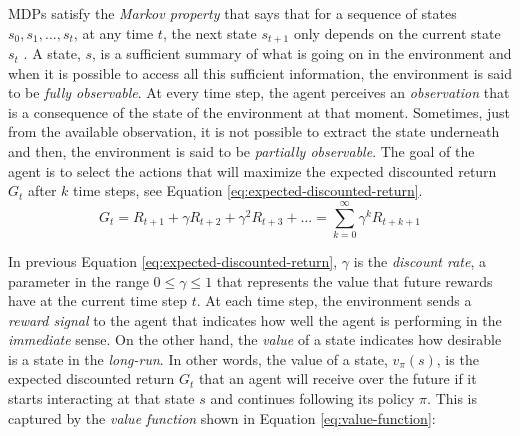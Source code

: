 








MDPs satisfy the \textit{Markov property} that says that for a sequence of states $s_0, s_1, ..., s_t$, at any time $t$, the next state $s_{t+1}$ only depends on the current state $s_t$ \cite{Osa:2018}. A state, $s$, is a sufficient summary of what is going on in the environment and when it is possible to access all this sufficient information, the environment is said to be \textit{fully observable}. At every time step, the agent perceives an \textit{observation} that is a consequence of the state of the environment at that moment. Sometimes, just from the available observation, it is not possible to extract the state underneath and then, the environment is said to be \textit{partially observable}. The goal of the agent is to select the actions that will maximize the expected discounted return $G_t$ after $k$ time steps, see Equation \eqref{eq:expected-discounted-return}.
\begin{equation}
G_t = R_{t+1} + \gamma R_{t+2} + \gamma^2 R_{t+3} +... = \sum_{k=0}^{\infty} \gamma ^k R_{t+k+1}
\label{eq:expected-discounted-return}
\end{equation}




In previous Equation \eqref{eq:expected-discounted-return}, $\gamma$ is the \textit{discount rate}, a parameter in the range $0 \leq \gamma \leq 1$ that represents the value that future rewards have at the current time step $t$. At each time step, the environment sends a \textit{reward signal} to the agent that indicates how well the agent is performing in the \textit{immediate} sense. On the other hand, the \textit{value} of a state indicates how desirable is a state in the \textit{long-run}. In other words, the value of a state, $v_\pi \left(s\right) $, is the expected discounted return $G_t$ that an agent will receive over the future if it starts interacting at that state $s$ and continues following its policy $\pi$. This is captured by the \textit{value function} shown in Equation \eqref{eq:value-function}:






